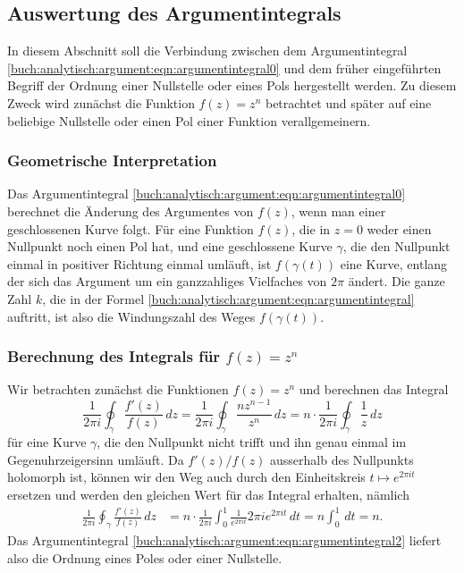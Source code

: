 %
%
%
\subsection{Auswertung des Argumentintegrals
\label{buch:analytisch:argument:subsection:zn}}
In diesem Abschnitt soll die Verbindung zwischen dem Argumentintegral
\eqref{buch:analytisch:argument:eqn:argumentintegral0}
und dem früher eingeführten Begriff der Ordnung einer Nullstelle
oder eines Pols hergestellt werden.
Zu diesem Zweck wird zunächst die Funktion $f(z)=z^n$ 
betrachtet und später auf eine beliebige Nullstelle oder einen
Pol einer Funktion verallgemeinern.

%
%
\subsubsection{Geometrische Interpretation}
Das Argumentintegral
\eqref{buch:analytisch:argument:eqn:argumentintegral0}
berechnet die Änderung des Argumentes von $f(z)$, wenn man
einer geschlossenen Kurve folgt.
Für eine Funktion $f(z)$, die in $z=0$ weder einen Nullpunkt noch
einen Pol hat, und eine geschlossene Kurve $\gamma$, die den
Nullpunkt einmal in positiver Richtung einmal umläuft, ist
$f(\gamma(t))$ eine Kurve, entlang der sich das Argument um ein ganzzahliges
Vielfaches von $2\pi$ ändert.
Die ganze Zahl $k$, die in der Formel
\eqref{buch:analytisch:argument:eqn:argumentintegral} auftritt,
ist also die Windungszahl des Weges $f(\gamma(t))$.

%
%
\subsubsection{Berechnung des Integrals für $f(z)=z^n$}
Wir betrachten zunächst die Funktionen $f(z)=z^n$ und berechnen 
das Integral
\begin{equation}
\frac{1}{2\pi i}
\oint_{\gamma}
\frac{f'(z)}{f(z)}
\,dz
=
\frac{1}{2\pi i}
\oint_{\gamma}
\frac{nz^{n-1}}{z^n}
\,dz
=
n\cdot
\frac{1}{2\pi i}
\oint_{\gamma}
\frac{1}{z}
\,dz
\label{buch:analytisch:argument:eqn:argumentintegral2}
\end{equation}
für eine Kurve $\gamma$, die den Nullpunkt nicht trifft und ihn
genau einmal im Gegenuhrzeigersinn umläuft.
Da $f'(z)/f(z)$ ausserhalb des Nullpunkts holomorph ist, können
wir den Weg auch durch den Einheitskreis $t\mapsto e^{2\pi it}$
ersetzen und werden den gleichen Wert für das Integral erhalten,
nämlich
\begin{align*}
\frac{1}{2\pi i}
\oint_{\gamma}
\frac{f'(z)}{f(z)}
\,dz
&=
n\cdot
\frac{1}{2\pi i}
\int_0^1
\frac{1}{e^{2\pi it}}
2\pi ie^{2\pi it}
\,dt
=
n
\int_0^1\,dt
=
n.
\end{align*}
Das Argumentintegral
\eqref{buch:analytisch:argument:eqn:argumentintegral2}
liefert also die Ordnung eines Poles oder einer Nullstelle.

